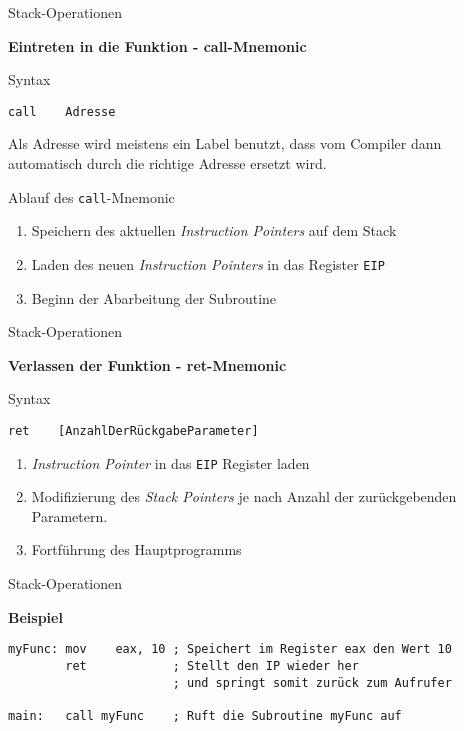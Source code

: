 \begin{frame}[fragile]{Stack-Operationen}

\begin{center}
\textbf{Eintreten in die Funktion - call-Mnemonic}
\end{center}

Syntax
\begin{lstlisting}
call    Adresse
\end{lstlisting}

Als Adresse wird meistens ein Label benutzt, dass vom Compiler dann automatisch durch die richtige Adresse ersetzt wird.

\makebox{}

Ablauf des \texttt{call}-Mnemonic
\begin{enumerate}
    \item Speichern des aktuellen \textit{Instruction Pointers} auf dem Stack
    \item Laden des neuen \textit{Instruction Pointers} in das Register \texttt{EIP}
    \item Beginn der Abarbeitung der Subroutine
\end{enumerate}

\end{frame}


\begin{frame}[fragile]{Stack-Operationen}

\begin{center}
\textbf{Verlassen der Funktion - ret-Mnemonic}
\end{center}

Syntax
\begin{lstlisting}
ret    [AnzahlDerRückgabeParameter]
\end{lstlisting}

\makebox

\begin{enumerate}
    \item \textit{Instruction Pointer} in das \texttt{EIP} Register laden
    \item Modifizierung des \textit{Stack Pointers} je nach Anzahl der zurückgebenden Parametern.
    \item Fortführung des Hauptprogramms
\end{enumerate}
\end{frame}


\begin{frame}[fragile]{Stack-Operationen}

\begin{center}
\textbf{Beispiel}
\end{center}

\begin{lstlisting}
myFunc: mov    eax, 10 ; Speichert im Register eax den Wert 10
        ret            ; Stellt den IP wieder her
                       ; und springt somit zurück zum Aufrufer

main:   call myFunc    ; Ruft die Subroutine myFunc auf
\end{lstlisting}
\end{frame}
